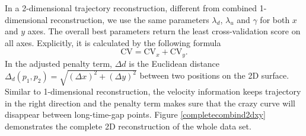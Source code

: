In a 2-dimensional trajectory reconstruction, different from combined 1-dimensional reconstruction, we use the same parameters $\lambda_d$, $\lambda_u$ and $\gamma$ for both $x$ and $y$ axes. The overall best parameters return the least cross-validation score on all axes. Explicitly, it is calculated by the following formula 
\begin{equation}
\mbox{CV}=\mbox{CV}_x+\mbox{CV}_y.
\end{equation}
In the adjusted penalty term, $\Delta d$ is the Euclidean distance $\Delta_d(p_1,p_2)=\sqrt{(\Delta x)^2+(\Delta y)^2}$ between two positions on the 2D surface. Similar to 1-dimensional reconstruction, the velocity information keeps trajectory in the right direction and the penalty term makes sure that the crazy curve will disappear between long-time-gap points. Figure \ref{completecombind2dxy} demonstrates the complete 2D reconstruction of the whole data set.  

